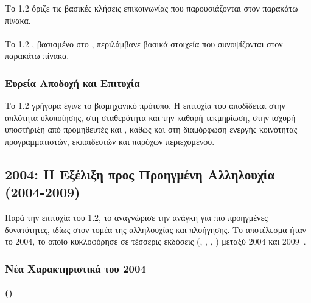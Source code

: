 Το  1.2  όριζε τις βασικές κλήσεις επικοινωνίας που παρουσιάζονται στον παρακάτω πίνακα.



\paragraph{ }

Το  1.2  , βασισμένο στο    , περιλάμβανε βασικά στοιχεία που συνοψίζονται στον παρακάτω πίνακα.



\subsubsection{Ευρεία Αποδοχή και Επιτυχία}

Το  1.2 γρήγορα έγινε το βιομηχανικό πρότυπο. Η επιτυχία του αποδίδεται στην απλότητα υλοποίησης, στη σταθερότητα και την καθαρή τεκμηρίωση, στην ισχυρή υποστήριξη από προμηθευτές  και  , καθώς και στη διαμόρφωση ενεργής κοινότητας προγραμματιστών, εκπαιδευτών και παρόχων περιεχομένου.

\subsection{ 2004: Η Εξέλιξη προς Προηγμένη Αλληλουχία (2004-2009)}
\label{subsec:scorm_2004}

Παρά την επιτυχία του  1.2, το  αναγνώρισε την ανάγκη για πιο προηγμένες δυνατότητες, ιδίως στον τομέα της αλληλουχίας και πλοήγησης. Το αποτέλεσμα ήταν το  2004, το οποίο κυκλοφόρησε σε τέσσερις εκδόσεις (, , ,  ) μεταξύ 2004 και 2009~\cite{adl2009scorm2004,adl2009impact}.

\subsubsection{Νέα Χαρακτηριστικά του  2004}

\paragraph{   ()}

